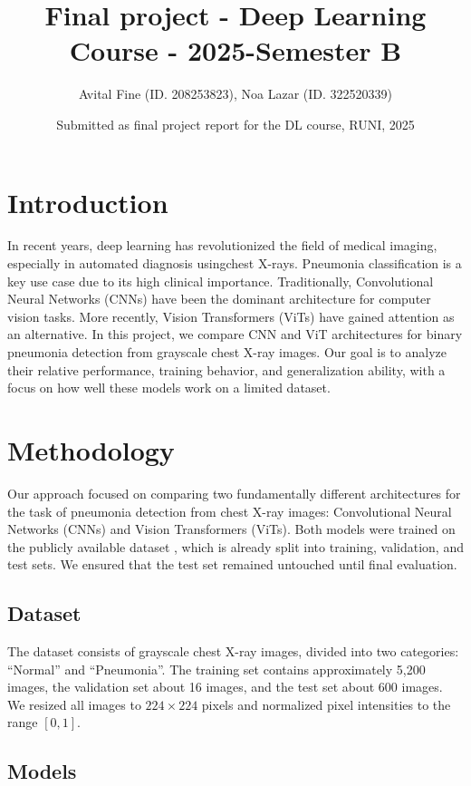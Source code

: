 \documentclass{article}
\title{Final project - Deep Learning Course - 2025-Semester B}
\author{Avital Fine (ID. 208253823), Noa Lazar (ID. 322520339)}
\date{Submitted as final project report for the DL course, RUNI, 2025}
\begin{document}
\maketitle

\section{Introduction}
In recent years, deep learning has revolutionized the field of medical imaging, especially in automated diagnosis usingchest X-rays. Pneumonia classification is a key use case due to its high clinical importance. Traditionally, Convolutional Neural Networks (CNNs) have been the dominant architecture for computer vision tasks. More recently, Vision Transformers (ViTs) \citep{dosovitskiy2020image} have gained attention as an alternative. In this project, we compare CNN and ViT architectures for binary pneumonia detection from grayscale chest X-ray images. Our goal is to analyze their relative performance, training behavior, and generalization ability, with a focus on how well these models work on a limited dataset.

\section{Methodology}

Our approach focused on comparing two fundamentally different architectures for the task of pneumonia detection from chest X-ray images: Convolutional Neural Networks (CNNs) and Vision Transformers (ViTs). Both models were trained on the publicly available dataset \cite{kaggle_pneumonia}, which is already split into training, validation, and test sets. We ensured that the test set remained untouched until final evaluation.

\subsection{Dataset}
The dataset consists of grayscale chest X-ray images, divided into two categories: ``Normal'' and ``Pneumonia''. The training set contains approximately 5,200 images, the validation set about 16 images, and the test set about 600 images. We resized all images to $224 \times 224$ pixels and normalized pixel intensities to the range $[0,1]$.

\subsection{Models}
\end{document}
